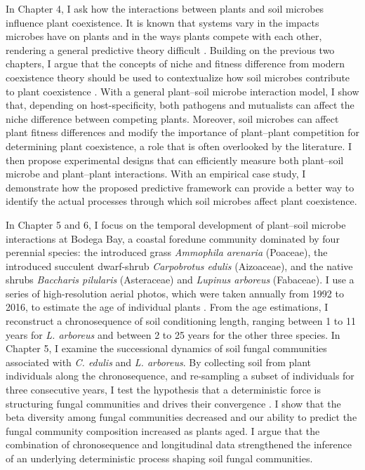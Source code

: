 In Chapter 4, I ask how the interactions between plants and soil microbes influence plant coexistence. It is known that systems vary in the impacts microbes have on plants and in the ways plants compete with each other, rendering a general predictive theory difficult \citep{Lekberg2018}. Building on the previous two chapters, I argue that the concepts of niche and fitness difference from modern coexistence theory should be used to contextualize how soil microbes contribute to plant coexistence \citep{KeMiki2015}. 
With a general plant--soil microbe interaction model, I show that, depending on host-specificity, both pathogens and mutualists can affect the niche difference between competing plants. Moreover, soil microbes can affect plant fitness differences and modify the importance of plant--plant competition for determining plant coexistence, a role that is often overlooked by the literature. I then propose experimental designs that can efficiently measure both plant--soil microbe and plant--plant interactions. With an empirical case study, I demonstrate how the proposed predictive framework can provide a better way to identify the actual processes through which soil microbes affect plant coexistence.
\par


In Chapter 5 and 6, I focus on the temporal development of plant--soil microbe interactions at Bodega Bay, a coastal foredune community dominated by four perennial species: the introduced grass \textit{Ammophila arenaria} (Poaceae), the introduced succulent dwarf-shrub \textit{Carpobrotus edulis} (Aizoaceae), and the native shrubs \textit{Baccharis pilularis} (Asteraceae) and \textit{Lupinus arboreus} (Fabaceae). I use a series of high-resolution aerial photos, which were taken annually from 1992 to 2016, to estimate the age of individual plants \citep{Danin1998}. From the age estimations, I reconstruct a chronosequence of soil conditioning length, ranging between 1 to 11 years for \textit{L. arboreus} and between 2 to 25 years for the other three species.
In Chapter 5, I examine the successional dynamics of soil fungal communities associated with \textit{C. edulis} and \textit{L. arboreus}. By collecting soil from plant individuals along the chronosequence, and re-sampling a subset of individuals for three consecutive years, I test the hypothesis that a deterministic force is structuring fungal communities and drives their convergence \citep{Connell1977, DiniAndreote2015, Li2016}. 
I show that the beta diversity among fungal communities decreased and our ability to predict the fungal community composition increased as plants aged. I argue that the combination of chronosequence and longitudinal data strengthened the inference of an underlying deterministic process shaping soil fungal communities.
\par 


